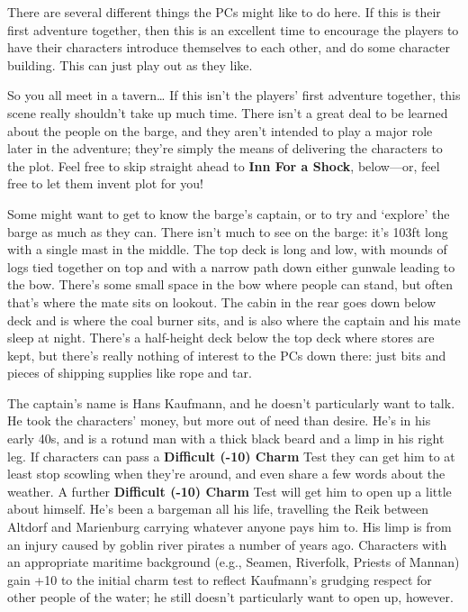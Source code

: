 There are several different things the PCs might like to do here. If this is
their first adventure together, then this is an excellent time to encourage the
players to have their characters introduce themselves to each other, and do some
character building. This can just play out as they like.

\begin{gmnote}{So you all meet in a tavern\ldots{}}
If this isn't the players' first adventure together, this scene really shouldn't
take up much time. There isn't a great deal to be learned about the people on
the barge, and they aren't intended to play a major role later in the adventure;
they're simply the means of delivering the characters to the plot. Feel free to
skip straight ahead to \textbf{Inn For a Shock}, below---or, feel free to let
them invent plot for you!
\end{gmnote}

Some might want to get to know the barge's captain, or to try and `explore' the
barge as much as they can. There isn't much to see on the barge: it's 103ft long
with a single mast in the middle. The top deck is long and low, with mounds of
logs tied together on top and with a narrow path down either gunwale leading to
the bow. There's some small space in the bow where people can stand, but often
that's where the mate sits on lookout. The cabin in the rear goes down below
deck and is where the coal burner sits, and is also where the captain and his
mate sleep at night. There's a half-height deck below the top deck where stores
are kept, but there's really nothing of interest to the PCs down there: just
bits and pieces of shipping supplies like rope and tar.

The captain's name is Hans Kaufmann, and he doesn't particularly want to talk.
He took the characters' money, but more out of need than desire. He's in his
early 40s, and is a rotund man with a thick black beard and a limp in his right
leg. If characters can pass a \textbf{Difficult \mbox{(-10)} Charm} Test they can
get him to at least stop scowling when they're around, and even share a few
words about the weather. A further \textbf{Difficult (-10) Charm} Test will
get him to open up a little about himself. He's been a bargeman all his life,
travelling the Reik between Altdorf and Marienburg carrying whatever anyone pays
him to. His limp is from an injury caused by goblin river pirates a number of
years ago. Characters with an appropriate maritime background (e.g., Seamen,
Riverfolk, Priests of Mannan) gain +10 to the initial charm test to reflect
Kaufmann's grudging respect for other people of the water; he still doesn't
particularly want to open up, however.

